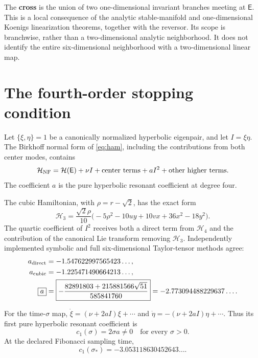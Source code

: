 \documentclass[11pt,letterpaper]{article}
\theoremstyle{paper}
\newcommand{\euler}{\mathsf E}
\newcommand{\term}[1]{\textbf{#1}}
\begin{document}
The \term{cross} is the union of two one-dimensional invariant branches meeting at $\euler$. This is a local consequence of the analytic stable-manifold and one-dimensional Koenigs linearization theorems, together with the reversor. Its scope is branchwise, rather than a two-dimensional analytic neighborhood. It does not identify the entire six-dimensional neighborhood with a two-dimensional linear map.

\section{The fourth-order stopping condition}

Let $\{\xi,\eta\}=1$ be a canonically normalized hyperbolic eigenpair, and let $I=\xi\eta$. The Birkhoff normal form of \eqref{eq:ham}, including the contributions from both center modes, contains
\begin{equation}
\mathcal H_{\rm NF}=\mathcal H(\euler)+\nu I+\text{center terms}+a I^2+\text{other higher terms}.
\label{eq:nf}
\end{equation}
The coefficient $a$ is the pure hyperbolic resonant coefficient at degree four.

The cubic Hamiltonian, with $\rho=r-\sqrt2$, has the exact form
\begin{equation}
\mathcal H_3=\frac{\sqrt2\rho}{10}
\bigl(-5\rho^2-10uy+10vx+36x^2-18y^2\bigr).
\label{eq:cubic}
\end{equation}
The quartic coefficient of $I^2$ receives both a direct term from $\mathcal H_4$ and the contribution of the canonical Lie transform removing $\mathcal H_3$. Independently implemented symbolic and full six-dimensional Taylor-tensor methods agree:
\begin{align}
 a_{\rm direct}&=-1.547622997565423\ldots,\notag\\
 a_{\rm cubic}&=-1.225471490664213\ldots,\notag\\
 \boxed{a}&=\boxed{-\frac{82891803+215881566\sqrt{51}}{585841760}}
 =-2.773094488229637\ldots.
\label{eq:a}
\end{align}

For the time-$\sigma$ map, $\dot\xi=(\nu+2aI)\xi+\cdots$ and $\dot\eta=-(\nu+2aI)\eta+\cdots$. Thus its first pure hyperbolic resonant coefficient is
\begin{equation}
\boxed{c_1(\sigma)=2\sigma a\ne0\quad\text{for every }\sigma>0.}
\label{eq:c1}
\end{equation}
At the declared Fibonacci sampling time,
\begin{equation}
\boxed{c_1(\sigma_*)=-3.053118630452643\ldots.}
\end{equation}
\end{document}
